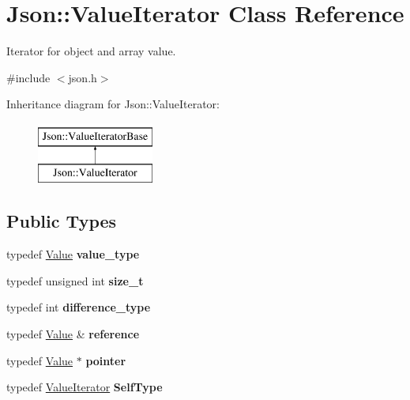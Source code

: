 \hypertarget{class_json_1_1_value_iterator}{}\section{Json\+:\+:Value\+Iterator Class Reference}
\label{class_json_1_1_value_iterator}


Iterator for object and array value.  




{\ttfamily \#include $<$json.\+h$>$}

Inheritance diagram for Json\+:\+:Value\+Iterator\+:\begin{figure}[H]
\begin{center}
\leavevmode
\includegraphics[height=2.000000cm]{class_json_1_1_value_iterator}
\end{center}
\end{figure}
\subsection*{Public Types}
\begin{DoxyCompactItemize}
\item 
\mbox{\label{class_json_1_1_value_iterator_a2c5ba7be611f05546530c8a88b2d2e37}} 
typedef \hyperlink{class_json_1_1_value}{Value} {\bfseries value\+\_\+type}
\item 
\mbox{\label{class_json_1_1_value_iterator_a308b8932ffc83eaa9d12dadd5c11a7dd}} 
typedef unsigned int {\bfseries size\+\_\+t}
\item 
\mbox{\label{class_json_1_1_value_iterator_a2be1a9aa60bbfc8812e9dd1a7f1a8786}} 
typedef int {\bfseries difference\+\_\+type}
\item 
\mbox{\label{class_json_1_1_value_iterator_ae87929b4567aa00372cf602c43b57160}} 
typedef \hyperlink{class_json_1_1_value}{Value} \& {\bfseries reference}
\item 
\mbox{\label{class_json_1_1_value_iterator_acec45feb1ef1f3bf81240157d06d5432}} 
typedef \hyperlink{class_json_1_1_value}{Value} $\ast$ {\bfseries pointer}
\item 
\mbox{\label{class_json_1_1_value_iterator_a23357670fdad61792670d86f62db7e16}} 
typedef \hyperlink{class_json_1_1_value_iterator}{Value\+Iterator} {\bfseries Self\+Type}
\end{DoxyCompactItemize}
